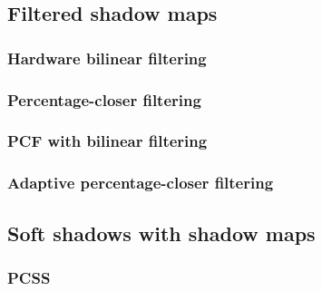 \subsection{Filtered shadow maps}

\subsubsection{Hardware bilinear filtering}

\subsubsection{Percentage-closer filtering}

\subsubsection{PCF with bilinear filtering}

\subsubsection{Adaptive percentage-closer filtering}

\subsection{Soft shadows with shadow maps}

\subsubsection{PCSS}

